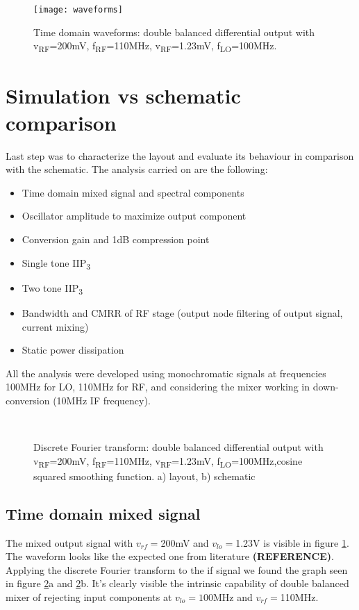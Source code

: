 
\begin{figure}[H]
	\centering
	\texttt{[image: waveforms]}
	\caption{Time domain waveforms: double balanced differential output with v\textsubscript{RF}=200mV,  f\textsubscript{RF}=110MHz, v\textsubscript{RF}=1.23mV, f\textsubscript{LO}=100MHz.}
	\label{fig:TdomaniWF}
\end{figure}


\section{Simulation vs schematic comparison}

Last step was to characterize the layout and evaluate its behaviour in comparison with the schematic. The analysis carried on are the following:
\begin{itemize}
	\item Time domain mixed signal and spectral components
	\item Oscillator amplitude to maximize output component
	\item Conversion gain and 1dB compression point
	\item Single tone IIP\textsubscript{3}
	\item Two tone IIP\textsubscript{3}
	\item Bandwidth and CMRR of RF stage (output node filtering of output signal, current mixing)
	\item Static power dissipation
\end{itemize}
All the analysis were developed using monochromatic signals at frequencies 100MHz for LO, 110MHz for RF, and considering the mixer working in down-conversion (10MHz IF frequency).

\begin{figure}[H] 
	\centering
	 \\
	\caption{Discrete Fourier transform: double balanced differential output with v\textsubscript{RF}=200mV,  f\textsubscript{RF}=110MHz, v\textsubscript{RF}=1.23mV, f\textsubscript{LO}=100MHz,cosine squared smoothing function. a) layout, b) schematic}
	\label{fig:TdomaniDFT}
\end{figure}
\subsection{Time domain mixed signal}
The mixed output signal with \(v_{rf}=\)200mV and \(v_{lo}=\)1.23V is visible in figure \ref{fig:TdomaniWF}. The waveform looks like the expected one from literature \textbf{(REFERENCE)}.
Applying the discrete Fourier transform to the if signal we found the graph seen in figure \ref{fig:TdomaniDFT}a and \ref{fig:TdomaniDFT}b.
It's clearly visible the intrinsic capability of double balanced mixer of rejecting input components at \(v_{lo}=100\)MHz and \(v_{rf}=\)110MHz.

